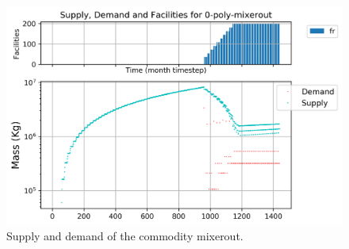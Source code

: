 \documentclass[11pt]{article}
\begin{document}
\begin{figure}[!h]
	\centering
	\includegraphics[width=\textwidth]{23-figures/0-poly-mixerout.png} 
	\hfill
	\caption{Supply and demand of the commodity mixerout.}
	\label{fig:23-mixerout}
\end{figure}
\end{document}
